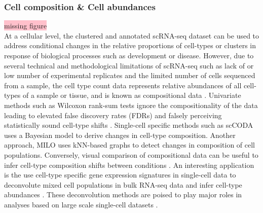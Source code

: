 \subsubsection{Cell composition \& Cell abundances}
 \colorbox{pink}{missing figure}\\
At a cellular level, the clustered and annotated scRNA-seq dataset can be used to address conditional changes in the relative proportions of cell-types or clusters in response of biological processes such as development or disease. However, due to several technical and methodological limitations of scRNA-seq such as lack of or low number of experimental replicates and the limited number of cells sequenced from a sample, the cell type count data represents relative abundances of all cell-types of a sample or tissue, and is known as compositional data \textbf{\cite{noauthor_compositional_nodate}}. Univariate methods such as Wilcoxon rank-sum tests ignore the compositionality of the data leading to elevated false discovery rates (FDRs) and falsely perceiving statistically sound cell-type shifts \textbf{\cite{heumos_best_2023,noauthor_compositional_nodate}}. Single-cell specific methods such as scCODA \textbf{\cite{heumos_best_2023,buttner_sccoda_2021}} uses a Bayesian model to derive changes in cell-type composition. Another approach, MILO \textbf{\cite{heumos_best_2023,dann_differential_2022}} uses kNN-based graphs to detect changes in composition of cell populations. Conversely, visual comparison of compositional data can be useful to infer cell-type composition shifts between conditions \textbf{\cite{lueckenmalte_d_current_2019}}. An interesting application is the use cell-type specific gene expression signatures in single-cell data to deconvolute mixed cell populations in bulk RNA-seq data and infer cell-type abundances \textbf{\cite{newman_robust_2015,newman_determining_2019,chu_cell_2022}}. These deconvolution methods are poised to play major roles in analyses based on large scale single-cell datasets \textbf{\cite{cobos_effective_2023}}. 

